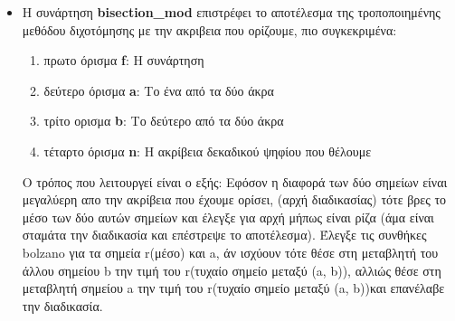 \documentclass[a4paper,11pt]{article}
\newcommand{\lt}{\latintext}
\newcommand{\gt}{\greektext}
\begin{document}
\begin{flushleft}
\begin{itemize}
\item Η συνάρτηση \lt \textbf{bisection\_mod} \gt επιστρέφει το αποτέλεσμα της τροποποιημένης μεθόδου διχοτόμησης με την ακριβεια που ορίζουμε, πιο συγκεκριμένα:\linebreak 
\begin{enumerate}
\item πρωτο όρισμα \lt \textbf{f}: \gt Η συνάρτηση
\item δεύτερο όρισμα \lt \textbf{a}: \gt Το ένα από τα δύο άκρα
\item τρίτο ορισμα \lt \textbf{b}: \gt Το δεύτερο από τα δύο άκρα
\item τέταρτο όρισμα \lt \textbf{n}: \gt Η ακρίβεια δεκαδικού ψηφίου που θέλουμε
\end{enumerate}
Ο τρόπος που λειτουργεί είναι ο εξής:\linebreak 
	Εφόσον η διαφορά των δύο σημείων είναι μεγαλύερη απο την ακρίβεια που έχουμε ορίσει, (αρχή διαδικασίας) τότε βρες το μέσο των δύο αυτών σημείων και έλεγξε για αρχή μήπως είναι ρίζα (άμα είναι σταμάτα την διαδικασία και επέστρεψε το αποτέλεσμα). Έλεγξε τις συνθήκες \lt bolzano \gt για τα σημεία \lt r\gt (μέσο) και \lt a, \gt άν ισχύουν τότε θέσε στη μεταβλητή του άλλου σημείου \lt b \gt την τιμή του \lt r\gt (τυχαίο σημείο μεταξύ \lt (a, b))\gt, αλλιώς θέσε στη μεταβλητή σημείου \lt a \gt την τιμή του \lt r\gt (τυχαίο σημείο μεταξύ \lt (a, b))\gt και επανέλαβε την διαδικασία.\gt\linebreak \\
	
	


\end{itemize}
\end{flushleft}
\end{document}
